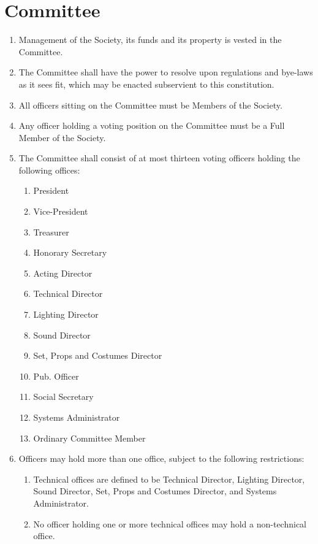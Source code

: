\documentclass[a4paper]{tufte-handout}
\newcommand{\policyOffset}{12pt}
\newcommand{\policyCspp}[2][\policyOffset]{\marginnote[#1]{\textsc{CSP Policy \S#2}}}
\begin{document}
\section{Committee}
\begin{enumerate}[resume]
    \item Management of the Society, its funds and its property is vested in the Committee.
    \item The Committee shall have the power to resolve upon regulations and bye-laws as it sees fit, which may be enacted subservient to this constitution.
    \item All officers sitting on the Committee must be Members of the Society.
    \item \policyCspp{66} Any officer holding a voting position on the Committee must be a Full Member of the Society.
    \item \policyCspp{65} The Committee shall consist of at most thirteen voting officers holding the following offices:
        \begin{enumerate}
            \item President
            \item Vice-President
            \item Treasurer
            \item Honorary Secretary
            \item Acting Director
            \item Technical Director
            \item Lighting Director
            \item Sound Director
            \item Set, Props and Costumes Director
            \item Pub. Officer
            \item Social Secretary
            \item Systems Administrator
            \item Ordinary Committee Member
        \end{enumerate}
    \item Officers may hold more than one office, subject to the following restrictions:
        \begin{enumerate}
            \item Technical offices are defined to be Technical Director, Lighting Director, Sound Director, Set, Props and Costumes Director, and Systems Administrator.
            \item No officer holding one or more technical offices may hold a non-technical office.

\end{enumerate}
\end{enumerate}
\end{document}
